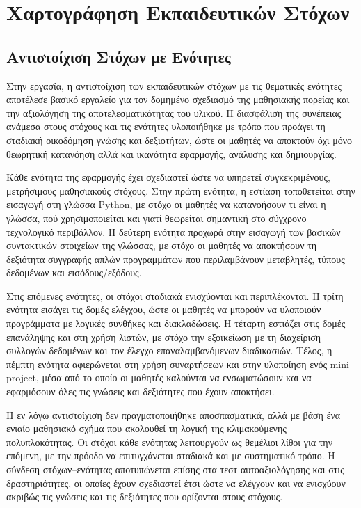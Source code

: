 \documentclass[11pt]{report}
\begin{document}
\chapter{Χαρτογράφηση Εκπαιδευτικών Στόχων}
\section{Αντιστοίχιση Στόχων με Ενότητες}

Στην εργασία, η αντιστοίχιση των εκπαιδευτικών στόχων με τις θεματικές ενότητες αποτέλεσε βασικό εργαλείο για τον δομημένο σχεδιασμό της μαθησιακής πορείας και την αξιολόγηση της αποτελεσματικότητας του υλικού. Η διασφάλιση της συνέπειας ανάμεσα στους στόχους και τις ενότητες υλοποιήθηκε με τρόπο που προάγει τη σταδιακή οικοδόμηση γνώσης και δεξιοτήτων, ώστε οι μαθητές να αποκτούν όχι μόνο θεωρητική κατανόηση αλλά και ικανότητα εφαρμογής, ανάλυσης και δημιουργίας. 

Κάθε ενότητα της εφαρμογής έχει σχεδιαστεί ώστε να υπηρετεί συγκεκριμένους, μετρήσιμους μαθησιακούς στόχους. Στην πρώτη ενότητα, η εστίαση τοποθετείται στην εισαγωγή στη γλώσσα Python, με στόχο οι μαθητές να κατανοήσουν τι είναι η γλώσσα, πού χρησιμοποιείται και γιατί θεωρείται σημαντική στο σύγχρονο τεχνολογικό περιβάλλον. Η δεύτερη ενότητα προχωρά στην εισαγωγή των βασικών συντακτικών στοιχείων της γλώσσας, με στόχο οι μαθητές να αποκτήσουν τη δεξιότητα συγγραφής απλών προγραμμάτων που περιλαμβάνουν μεταβλητές, τύπους δεδομένων και εισόδους/εξόδους. 

Στις επόμενες ενότητες, οι στόχοι σταδιακά ενισχύονται και περιπλέκονται. Η τρίτη ενότητα εισάγει τις δομές ελέγχου, ώστε οι μαθητές να μπορούν να υλοποιούν προγράμματα με λογικές συνθήκες και διακλαδώσεις. Η τέταρτη εστιάζει στις δομές επανάληψης και στη χρήση λιστών, με στόχο την εξοικείωση με τη διαχείριση συλλογών δεδομένων και τον έλεγχο επαναλαμβανόμενων διαδικασιών. Τέλος, η πέμπτη ενότητα αφιερώνεται στη χρήση συναρτήσεων και στην υλοποίηση ενός mini project, μέσα από το οποίο οι μαθητές καλούνται να ενσωματώσουν και να εφαρμόσουν όλες τις γνώσεις και δεξιότητες που έχουν αποκτήσει. 

Η εν λόγω αντιστοίχιση δεν πραγματοποιήθηκε αποσπασματικά, αλλά με βάση ένα ενιαίο μαθησιακό σχήμα που ακολουθεί τη λογική της κλιμακούμενης πολυπλοκότητας. Οι στόχοι κάθε ενότητας λειτουργούν ως θεμέλιοι λίθοι για την επόμενη, με την πρόοδο να επιτυγχάνεται σταδιακά και με συστηματικό τρόπο. Η σύνδεση στόχων–ενότητας αποτυπώνεται επίσης στα τεστ αυτοαξιολόγησης και στις δραστηριότητες, οι οποίες έχουν σχεδιαστεί έτσι ώστε να ελέγχουν και να ενισχύουν ακριβώς τις γνώσεις και τις δεξιότητες που ορίζονται στους στόχους. 
\end{document}
